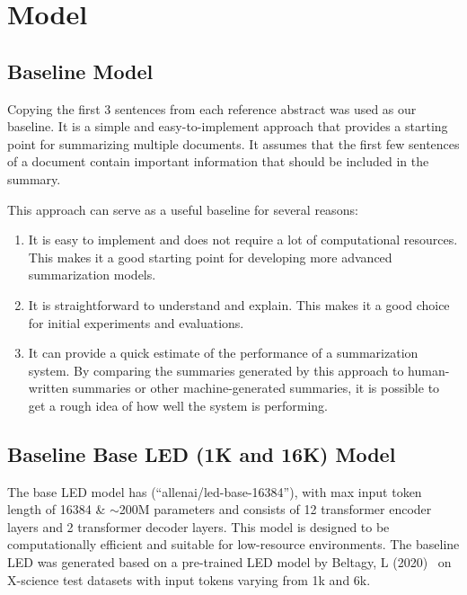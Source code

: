 \documentclass[12pt, twocolumn]{article}
\numberwithin{equation}{section}
\begin{document}
\section{Model}
\label{app:model}

\subsection{Baseline Model}
\label{app:model-baseline}

Copying the first 3 sentences from each reference abstract was used as our baseline. It is a simple and easy-to-implement approach that provides a starting point for summarizing multiple documents. It assumes that the first few sentences of a document contain important information that should be included in the summary.

This approach can serve as a useful baseline for several reasons:

\begin{enumerate}
    \item It is easy to implement and does not require a lot of computational resources. This makes it a good starting point for developing more advanced summarization models.
    \item It is straightforward to understand and explain. This makes it a good choice for initial experiments and evaluations.
    \item It can provide a quick estimate of the performance of a summarization system. By comparing the summaries generated by this approach to human-written summaries or other machine-generated summaries, it is possible to get a rough idea of how well the system is performing.
\end{enumerate}

\subsection{Baseline Base LED (1K and 16K) Model}
\label{app:model-base-led}

The base LED model has (``allenai/led-base-16384''), with max input token length of 16384 \& $\sim$200M parameters and consists of 12 transformer encoder layers and 2 transformer decoder layers. This model is designed to be computationally efficient and suitable for low-resource environments. The baseline LED was generated based on a pre-trained LED model by Beltagy, L (2020)~\cite{beltagy2020longformer} on X-science test datasets with input tokens varying from 1k and 6k. 
\end{document}
